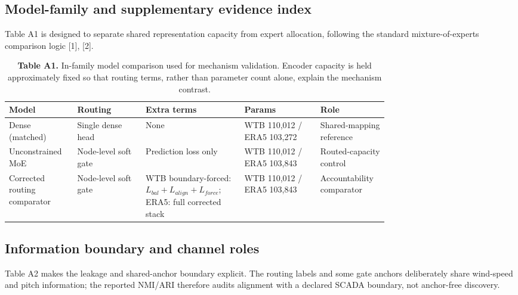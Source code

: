 \documentclass[
  journal]{IEEEtran}
\begin{document}
\FloatBarrier

\subsection*{Model-family and supplementary evidence
index}\label{model-family-and-supplementary-evidence-index}

Table A1 is designed to separate shared representation capacity from
expert allocation, following the standard mixture-of-experts comparison
logic {[}1{]}, {[}2{]}.

\begin{table}[!t]
\centering
\fontsize{8.0pt}{9.6pt}\selectfont
\setlength{\tabcolsep}{3pt}
\renewcommand{\arraystretch}{1.05}
\caption*{\textbf{Table A1.} In-family model comparison used for mechanism validation. Encoder capacity is held approximately fixed so that routing terms, rather than parameter count alone, explain the mechanism contrast.}
\begin{tabularx}{\linewidth}{>{\raggedright\arraybackslash}p{0.18\linewidth} >{\raggedright\arraybackslash}p{0.18\linewidth} >{\raggedright\arraybackslash}X >{\raggedright\arraybackslash}p{0.20\linewidth} >{\raggedright\arraybackslash}p{0.18\linewidth}}
\toprule
Model & Routing & Extra terms & Params & Role \\
\midrule
Dense (matched) & Single dense head & None & WTB 110,012 / ERA5 103,272 & Shared-mapping reference \\
Unconstrained MoE & Node-level soft gate & Prediction loss only & WTB 110,012 / ERA5 103,843 & Routed-capacity control \\
Corrected routing comparator & Node-level soft gate & WTB boundary-forced: $L_{bal}+L_{align}+L_{force}$; ERA5: full corrected stack & WTB 110,012 / ERA5 103,843 & Accountability comparator \\
\bottomrule
\end{tabularx}
\end{table}

\FloatBarrier

\subsection*{Information boundary and channel
roles}\label{information-boundary-and-channel-roles}

Table A2 makes the leakage and shared-anchor boundary explicit. The
routing labels and some gate anchors deliberately share wind-speed and
pitch information; the reported NMI/ARI therefore audits alignment with
a declared SCADA boundary, not anchor-free discovery.
\end{document}
